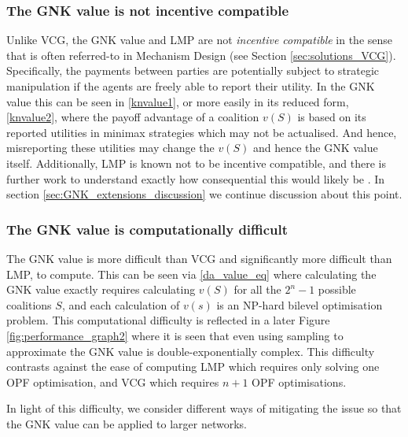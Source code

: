 \subsubsection*{The GNK value is not incentive compatible}
Unlike VCG, the GNK value and LMP are not \emph{incentive compatible} in the sense that is often referred-to in Mechanism Design (see Section \ref{sec:solutions_VCG}).
Specifically, the payments between parties are potentially subject to strategic manipulation if the agents are freely able to report their utility.
In the GNK value this can be seen in \eqref{knvalue1}, or more easily in its reduced form, \eqref{knvalue2}, where the payoff advantage of a coalition $v(S)$ is based on its reported utilities in minimax strategies which may not be actualised.
And hence, misreporting these utilities may change the $v(S)$ and hence the GNK value itself.
Additionally, LMP is known not to be incentive compatible, and there is further work to understand exactly how consequential this would likely be \cite{8054716}.
In section \ref{sec:GNK_extensions_discussion} we continue discussion about this point.

\subsubsection*{The GNK value is computationally difficult}
The GNK value is more difficult than VCG and significantly more difficult than LMP, to compute.
This can be seen via \eqref{da_value_eq} where calculating the GNK value exactly requires calculating $v(S)$ for all the $2^n-1$ possible coalitions $S$, and each calculation of $v(s)$ is an NP-hard bilevel optimisation problem.
This computational difficulty is reflected in a later Figure \ref{fig:performance_graph2} where it is seen that even using sampling to approximate the GNK value is double-exponentially complex. 
This difficulty contrasts against the ease of computing LMP which requires only solving one OPF optimisation, and VCG which requires $n+1$ OPF optimisations.

In light of this difficulty, we consider different ways of mitigating the issue so that the GNK value can be applied to larger networks.


